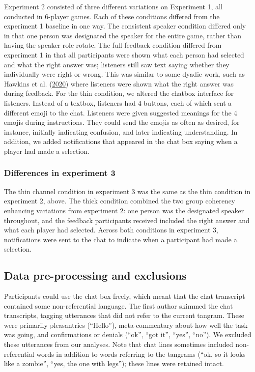 \documentclass[
  english,
  a4paper,
]{article}
\begin{document}
Experiment 2 consisted of three different variations on Experiment 1, all conducted in 6-player games. Each of these conditions differed from the experiment 1 baseline in one way. The consistent speaker condition differed only in that one person was designated the speaker for the entire game, rather than having the speaker role rotate. The full feedback condition differed from experiment 1 in that all participants were shown what each person had selected and what the right answer was; listeners still saw text saying whether they individually were right or wrong. This was similar to some dyadic work, such as Hawkins et al. (\protect\hyperlink{ref-hawkins2020}{2020}) where listeners were shown what the right answer was during feedback. For the thin condition, we altered the chatbox interface for listeners. Instead of a textbox, listeners had 4 buttons, each of which sent a different emoji to the chat. Listeners were given suggested meanings for the 4 emojis during instructions. They could send the emojis as often as desired, for instance, initially indicating confusion, and later indicating understanding. In addition, we added notifications that appeared in the chat box saying when a player had made a selection.

\hypertarget{differences-in-experiment-3}{%
\subsubsection{Differences in experiment 3}\label{differences-in-experiment-3}}

The thin channel condition in experiment 3 was the same as the thin condition in experiment 2, above. The thick condition combined the two group coherency enhancing variations from experiment 2: one person was the designated speaker throughout, and the feedback participants received included the right answer and what each player had selected. Across both conditions in experiment 3, notifications were sent to the chat to indicate when a participant had made a selection.

\hypertarget{data-pre-processing-and-exclusions}{%
\subsection{Data pre-processing and exclusions}\label{data-pre-processing-and-exclusions}}

Participants could use the chat box freely, which meant that the chat transcript contained some non-referential language. The first author skimmed the chat transcripts, tagging utterances that did not refer to the current tangram. These were primarily pleasantries (``Hello''), meta-commentary about how well the task was going, and confirmations or denials (``ok'', ``got it'', ``yes'', ``no''). We excluded these utterances from our analyses. Note that chat lines sometimes included non-referential words in addition to words referring to the tangrams (``ok, so it looks like a zombie'', ``yes, the one with legs''); these lines were retained intact.
\end{document}
